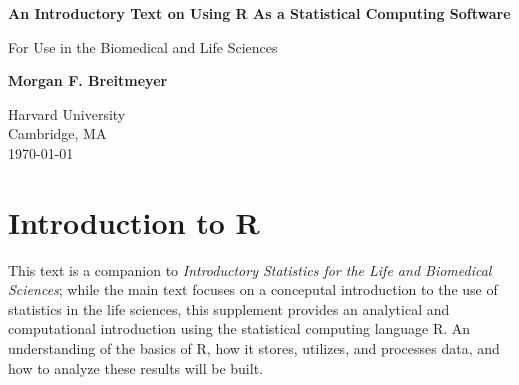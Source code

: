 \documentclass{report}\usepackage[]{graphicx}\usepackage[]{color}
\begin{document}
\minitoc

\begin{titlepage}
    \begin{center}
        \vspace*{1cm}
        
        \textbf{An Introductory Text on Using R As a Statistical Computing Software}
        
        \vspace{0.5cm}
        For Use in the Biomedical and Life Sciences 
        
        \vspace{1.5cm}
        
        \textbf{Morgan F. Breitmeyer}
        
        \vfill
        
        
        \vspace{0.8cm}
        
        
        Harvard University\\
        Cambridge, MA\\
        \today
        
    \end{center}
\end{titlepage}


\setcounter{tocdepth}{1}
\dominitoc
\tableofcontents

\newpage 
\setcounter{chapter}{-1}
\chapter{Introduction to \textsf{R}}
\minitoc

\pagestyle{fancy}


This text is a companion to \textit{Introductory Statistics for the Life and Biomedical Sciences}; while the main text focuses on a conceputal introduction to the use of statistics in the life sciences, this supplement provides an analytical and computational introduction using the statistical computing language \textsf{R}.  An understanding of the basics of \textsf{R}, how it stores, utilizes, and processes data, and how to analyze these results will be built.  
\end{document}
